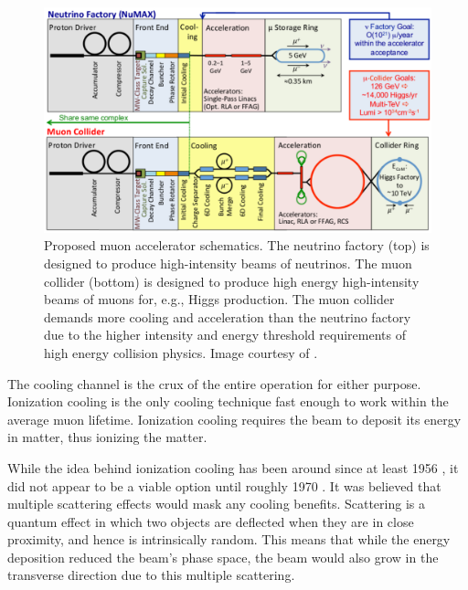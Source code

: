 \begin{figure}
  \centering
    \includegraphics[width=\textwidth]{Figures/muon_accelerator_schematic} 
  \caption[Proposed muon accelerator schematics.]{Proposed muon accelerator schematics. The neutrino factory (top) is designed to produce high-intensity beams of neutrinos. The muon collider (bottom) is designed to produce high energy high-intensity beams of muons for, e.g., Higgs production. The muon collider demands more cooling and acceleration than the neutrino factory due to the higher intensity and energy threshold requirements of high energy collision physics. Image courtesy of \cite{map}.}
  \label{fig:muon_accelerator_schematic}
\end{figure}


The cooling channel is the crux of the entire operation for either purpose. Ionization cooling is the only cooling technique fast enough to work within the average muon lifetime. Ionization cooling requires the beam to deposit its energy in matter, thus ionizing the matter.

While the idea behind ionization cooling has been around since at least 1956 \cite{oneill,lichtenberg}, it did not appear to be a viable option until roughly 1970 \cite{YuM}. It was believed that multiple scattering effects would mask any cooling benefits. Scattering is a quantum effect in which two objects are deflected when they are in close proximity, and hence is intrinsically random. This means that while the energy deposition reduced the beam's phase space, the beam would also grow in the transverse direction due to this multiple scattering.

